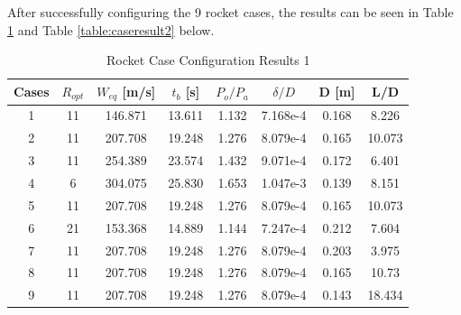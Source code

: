 \documentclass{report}
\begin{document}
After successfully configuring the 9 rocket cases, the results can be seen in Table \ref{table:caseresult1} and Table \ref{table:caseresult2} below.

\begin{table}[h!]
    \centering
    \caption{Rocket Case Configuration Results 1}
    \begin{tabular}{|c|c|c|c|c|c|c|c|}
        \hline
        \textbf{Cases} & $R_{opt}$ & $W_{eq}$ [m/s] & $t_b$ [s] & $P_o/P_a$ & $\delta/D$ & D [m] & L/D \\
        \hline
        1 & 11 & 146.871 & 13.611 & 1.132 & 7.168e-4 & 0.168 & 8.226 \\
        2 & 11 & 207.708 & 19.248 & 1.276 & 8.079e-4 & 0.165 & 10.073 \\
        3 & 11 & 254.389 & 23.574 & 1.432 & 9.071e-4 & 0.172 & 6.401 \\
        \hline
        4 & 6 & 304.075 & 25.830 & 1.653 & 1.047e-3 & 0.139 & 8.151 \\
        5 & 11 & 207.708 & 19.248 & 1.276 & 8.079e-4 & 0.165 & 10.073 \\
        6 & 21 & 153.368 & 14.889 & 1.144 & 7.247e-4 & 0.212 & 7.604 \\
        \hline
        7 & 11 & 207.708 & 19.248 & 1.276 & 8.079e-4 & 0.203 & 3.975 \\
        8 & 11 & 207.708 & 19.248 & 1.276 & 8.079e-4 & 0.165 & 10.73 \\
        9 & 11 & 207.708 & 19.248 & 1.276 & 8.079e-4 & 0.143 & 18.434 \\
        \hline
    \end{tabular}
    \label{table:caseresult1}
\end{table}
\end{document}
